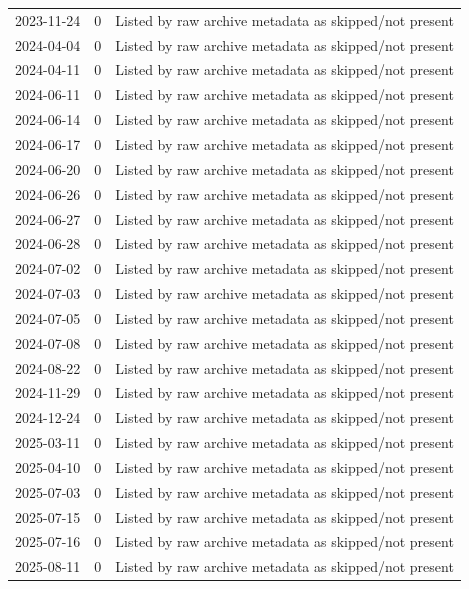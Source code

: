 \documentclass[11pt]{article}
\begin{document}
\begin{longtable}{rll}
2023-11-24 & 0 & Listed by raw archive metadata as skipped/not present \\
2024-04-04 & 0 & Listed by raw archive metadata as skipped/not present \\
2024-04-11 & 0 & Listed by raw archive metadata as skipped/not present \\
2024-06-11 & 0 & Listed by raw archive metadata as skipped/not present \\
2024-06-14 & 0 & Listed by raw archive metadata as skipped/not present \\
2024-06-17 & 0 & Listed by raw archive metadata as skipped/not present \\
2024-06-20 & 0 & Listed by raw archive metadata as skipped/not present \\
2024-06-26 & 0 & Listed by raw archive metadata as skipped/not present \\
2024-06-27 & 0 & Listed by raw archive metadata as skipped/not present \\
2024-06-28 & 0 & Listed by raw archive metadata as skipped/not present \\
2024-07-02 & 0 & Listed by raw archive metadata as skipped/not present \\
2024-07-03 & 0 & Listed by raw archive metadata as skipped/not present \\
2024-07-05 & 0 & Listed by raw archive metadata as skipped/not present \\
2024-07-08 & 0 & Listed by raw archive metadata as skipped/not present \\
2024-08-22 & 0 & Listed by raw archive metadata as skipped/not present \\
2024-11-29 & 0 & Listed by raw archive metadata as skipped/not present \\
2024-12-24 & 0 & Listed by raw archive metadata as skipped/not present \\
2025-03-11 & 0 & Listed by raw archive metadata as skipped/not present \\
2025-04-10 & 0 & Listed by raw archive metadata as skipped/not present \\
2025-07-03 & 0 & Listed by raw archive metadata as skipped/not present \\
2025-07-15 & 0 & Listed by raw archive metadata as skipped/not present \\
2025-07-16 & 0 & Listed by raw archive metadata as skipped/not present \\
2025-08-11 & 0 & Listed by raw archive metadata as skipped/not present \\

\end{longtable}
\end{document}
